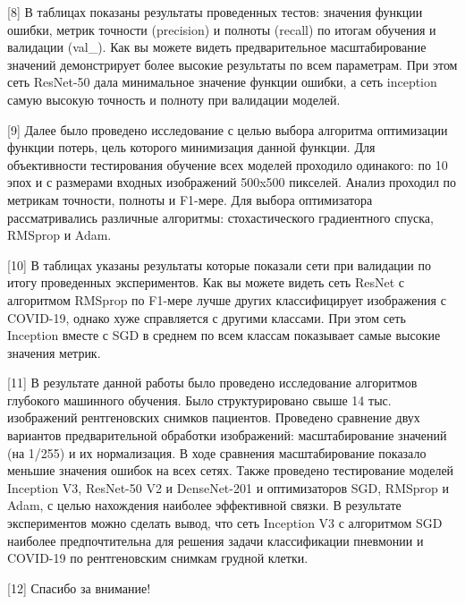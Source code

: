 [8]
В таблицах показаны результаты проведенных тестов: значения функции ошибки, метрик точности (precision) и полноты (recall)  по итогам обучения и валидации (val_). Как вы можете видеть предварительное масштабирование значений демонстрирует более высокие результаты по всем параметрам. При этом сеть ResNet-50 дала минимальное значение функции ошибки, а сеть inception самую высокую точность и полноту при валидации моделей.

[9]
Далее было проведено исследование с целью выбора алгоритма оптимизации функции потерь, цель которого минимизация данной функции. Для объективности тестирования обучение всех моделей проходило одинакого: по 10 эпох и с размерами входных изображений 500x500 пикселей. Анализ проходил по метрикам точности, полноты и F1-мере. Для выбора оптимизатора рассматривались различные алгоритмы: стохастического градиентного спуска, RMSprop и Adam. 

[10]
В таблицах указаны результаты которые показали сети при валидации по итогу проведенных экспериментов. Как вы можете видеть сеть ResNet с алгоритмом RMSprop по F1-мере лучше других классифицирует изображения с COVID-19, однако хуже справляется с другими классами. При этом сеть Inception вместе с SGD в среднем по всем классам показывает самые высокие значения метрик.    

[11]
В результате данной работы было проведено исследование алгоритмов глубокого машинного обучения. Было структурировано свыше 14 тыс. изображений рентгеновских снимков пациентов. Проведено сравнение двух вариантов предварительной обработки изображений: масштабирование значений (на 1/255) и их нормализация. В ходе сравнения масштабирование показало меньшие значения ошибок на всех сетях.
Также проведено тестирование моделей Inception V3, ResNet­-50 V2 и DenseNet-201 и оптимизаторов SGD, RMSprop и Adam, с целью нахождения наиболее эффективной связки. В результате экспериментов можно сделать вывод, что сеть Inception V3 с алгоритмом SGD наиболее предпочтительна для решения задачи классификации пневмонии и COVID-19 по рентгеновским снимкам грудной клетки.

[12]
Спасибо за внимание!

